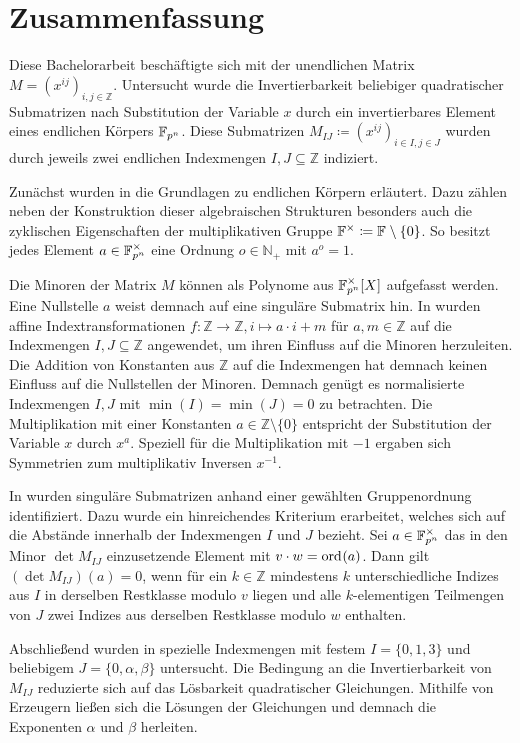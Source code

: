 \section{Zusammenfassung}

Diese Bachelorarbeit beschäftigte sich mit der unendlichen Matrix $M = \left( x^{ij} \right)_{i,j \in \mathbb{Z}}$. Untersucht wurde die Invertierbarkeit beliebiger quadratischer Submatrizen nach Substitution der Variable $x$ durch ein invertierbares Element eines endlichen Körpers $\field{p}[n]$. Diese Submatrizen $M_{IJ} \coloneqq \left( x^{ij} \right)_{i \in I,j \in J}$ wurden durch jeweils zwei endlichen Indexmengen $I,J \subseteq \mathbb{Z}$ indiziert. 

Zunächst wurden in  die Grundlagen zu endlichen Körpern erläutert. Dazu zählen neben der Konstruktion dieser algebraischen Strukturen besonders auch die zyklischen Eigenschaften der multiplikativen Gruppe $\field{}^\times \coloneqq \field{} \setminus \{0\}$. So besitzt jedes Element $a \in \field{p}[n]^\times$ eine Ordnung $o \in \mathbb{N}_+$ mit $a^o = 1$.

Die Minoren der Matrix $M$ können als Polynome aus $\field{p}[n]^\times [X]$ aufgefasst werden. Eine Nullstelle $a$ weist demnach auf eine singuläre Submatrix hin. In  wurden affine Indextransformationen $f:\mathbb{Z} \rightarrow \mathbb{Z}, i \mapsto a\cdot i + m$ für $a,m \in \mathbb{Z}$ auf die Indexmengen $I,J \subseteq \mathbb{Z}$ angewendet, um ihren Einfluss auf die Minoren herzuleiten. Die Addition von Konstanten aus $\mathbb{Z}$ auf die Indexmengen hat demnach keinen Einfluss auf die Nullstellen der Minoren. Demnach genügt es normalisierte Indexmengen $I,J$ mit $\min(I) = \min(J) = 0$ zu betrachten. Die Multiplikation mit einer Konstanten $a \in \mathbb{Z}\setminus\{0\}$ entspricht der Substitution der Variable $x$ durch $x^a$. Speziell für die Multiplikation mit $-1$ ergaben sich Symmetrien zum multiplikativ Inversen $x^{-1}$.

In  wurden singuläre Submatrizen anhand einer gewählten Gruppenordnung identifiziert. Dazu wurde ein hinreichendes Kriterium erarbeitet, welches sich auf die Abstände innerhalb der Indexmengen $I$ und $J$ bezieht. Sei $a\in \field{p}[n]^\times$ das in den Minor $\det M_{IJ}$ einzusetzende Element mit $v\cdot w = \ord{a}$. Dann gilt $(\det M_{IJ})(a) = 0$, wenn für ein $k\in \mathbb{Z}$ mindestens $k$ unterschiedliche Indizes aus $I$ in derselben Restklasse modulo $v$ liegen und alle $k$-elementigen Teilmengen von $J$ zwei Indizes aus derselben Restklasse modulo $w$ enthalten.

Abschließend wurden in  spezielle Indexmengen mit festem $I = \{0,1,3\}$ und beliebigem $J = \{0,\alpha,\beta\}$ untersucht. Die Bedingung an die Invertierbarkeit von $M_{IJ}$ reduzierte sich auf das Lösbarkeit quadratischer Gleichungen. Mithilfe von Erzeugern ließen sich die Lösungen der Gleichungen und demnach die Exponenten $\alpha$ und $\beta$ herleiten.